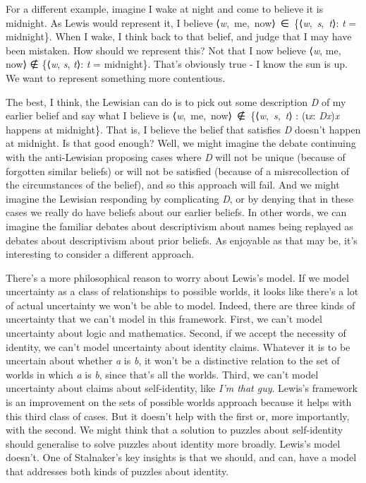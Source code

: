 \documentclass[
  10pt,
  letterpaper,
  DIV=11,
  numbers=noendperiod,
  twoside]{scrartcl}
\begin{document}
For a different example, imagine I wake at night and come to believe it
is midnight. As Lewis would represent it, I believe
⟨\emph{w},~me,~now⟩~∈~\{⟨\emph{w},~\emph{s},~\emph{t}⟩: \emph{t} =
midnight\}. When I wake, I think back to that belief, and judge that I
may have been mistaken. How should we represent this? Not that I now
believe ⟨\emph{w}, me, now⟩ ∉ \{⟨\emph{w}, \emph{s}, \emph{t}⟩: \emph{t}
= midnight\}. That's obviously true - I know the sun is up. We want to
represent something more contentious.

The best, I think, the Lewisian can do is to pick out some description
\emph{D} of my earlier belief and say what I believe is
⟨\emph{w},~me,~now⟩~∉~\{⟨\emph{w},~\emph{s},~\emph{t}⟩ : (ɩ\emph{x}:
\emph{Dx})\emph{x} happens at midnight\}. That is, I believe the belief
that satisfies \emph{D} doesn't happen at midnight. Is that good enough?
Well, we might imagine the debate continuing with the anti-Lewisian
proposing cases where \emph{D} will not be unique (because of forgotten
similar beliefs) or will not be satisfied (because of a misrecollection
of the circumstances of the belief), and so this approach will fail. And
we might imagine the Lewisian responding by complicating \emph{D}, or by
denying that in these cases we really do have beliefs about our earlier
beliefs. In other words, we can imagine the familiar debates about
descriptivism about names being replayed as debates about descriptivism
about prior beliefs. As enjoyable as that may be, it's interesting to
consider a different approach.

There's a more philosophical reason to worry about Lewis's model. If we
model uncertainty as a class of relationships to possible worlds, it
looks like there's a lot of actual uncertainty we won't be able to
model. Indeed, there are three kinds of uncertainty that we can't model
in this framework. First, we can't model uncertainty about logic and
mathematics. Second, if we accept the necessity of identity, we can't
model uncertainty about identity claims. Whatever it is to be uncertain
about whether \emph{a} is \emph{b}, it won't be a distinctive relation
to the set of worlds in which \emph{a} is \emph{b}, since that's all the
worlds. Third, we can't model uncertainty about claims about
self-identity, like \emph{I'm that guy}. Lewis's framework is an
improvement on the sets of possible worlds approach because it helps
with this third class of cases. But it doesn't help with the first or,
more importantly, with the second. We might think that a solution to
puzzles about self-identity should generalise to solve puzzles about
identity more broadly. Lewis's model doesn't. One of Stalnaker's key
insights is that we should, and can, have a model that addresses both
kinds of puzzles about identity.
\end{document}
